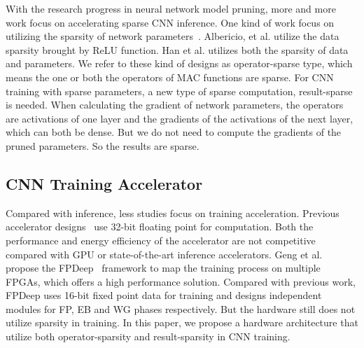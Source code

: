 With the research progress in neural network model pruning, more and more work focus on accelerating sparse CNN inference. One kind of work focus on utilizing the sparsity of network parameters~\cite{han2017ese,zhang2016cambricon}. Albericio, et al.\cite{albericio2016cnvlutin} utilize the data sparsity brought by ReLU function. Han et al. \cite{han2016eie} utilizes both the sparsity of data and parameters. We refer to these kind of designs as operator-sparse type, which means the one or both the operators of MAC functions are sparse. For CNN training with sparse parameters, a new type of sparse computation, result-sparse is needed. When calculating the gradient of network parameters, the operators are activations of one layer and the gradients of the activations of the next layer, which can both be dense. But we do not need to compute the gradients of the pruned parameters. So the results are sparse.

\subsection{CNN Training Accelerator}\label{sec:rw:train_acc}
Compared with inference, less studies focus on training acceleration. Previous accelerator designs~\cite{liu2017fpga, zhao2016f} use 32-bit floating point for computation. Both the performance and energy efficiency of the accelerator are not competitive compared with GPU or state-of-the-art inference accelerators. Geng et al. propose the FPDeep~\cite{geng2018fpdeep} framework to map the training process on multiple FPGAs, which offers a high performance solution. Compared with previous work, FPDeep uses 16-bit fixed point data for training and designs independent modules for FP, EB and WG phases respectively. But the hardware still does not utilize sparsity in training. In this paper, we propose a hardware architecture that utilize both operator-sparsity and result-sparsity in CNN training.

